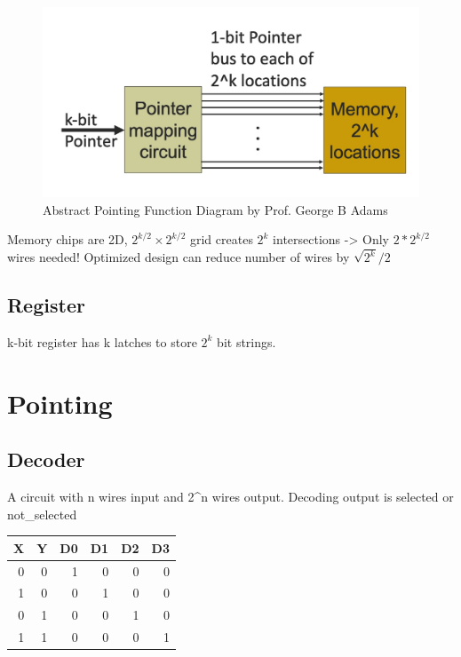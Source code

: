 \documentclass[11pt]{article}
\begin{document}
\begin{figure}[htbp]
\centering
\includegraphics[width=.9\linewidth]{./img/pointing_function.jpg}
\caption{\label{fig:org241f0a0}Abstract Pointing Function Diagram by Prof. George B Adams}
\end{figure}

Memory chips are 2D, \(2^{k/2} \times 2^{k/2}\) grid creates \(2^k\) intersections -> Only \(2 * 2^{k/2}\) wires needed! Optimized design can reduce number of wires by \(\sqrt{2^k} / 2\)

\subsection{Register}
\label{sec:org02141be}

k-bit register has k latches to store \(2^k\) bit strings.

\section{Pointing}
\label{sec:org7a60ce5}

\subsection{Decoder}
\label{sec:org0898d04}

A circuit with n wires input and 2\^{}n wires output. Decoding output is selected or not\_selected

\begin{center}
\begin{tabular}{rrrrrr}
X & Y & D0 & D1 & D2 & D3\\
\hline
0 & 0 & 1 & 0 & 0 & 0\\
1 & 0 & 0 & 1 & 0 & 0\\
0 & 1 & 0 & 0 & 1 & 0\\
1 & 1 & 0 & 0 & 0 & 1\\
\end{tabular}
\end{center}
\end{document}
